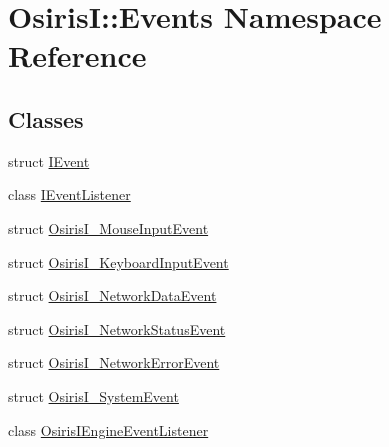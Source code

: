 \hypertarget{namespace_osiris_i_1_1_events}{\section{Osiris\-I\-:\-:Events Namespace Reference}
\label{namespace_osiris_i_1_1_events}
}
\subsection*{Classes}
\begin{DoxyCompactItemize}
\item 
struct \hyperlink{struct_osiris_i_1_1_events_1_1_i_event}{I\-Event}
\item 
class \hyperlink{class_osiris_i_1_1_events_1_1_i_event_listener}{I\-Event\-Listener}
\item 
struct \hyperlink{struct_osiris_i_1_1_events_1_1_osiris_i___mouse_input_event}{Osiris\-I\-\_\-\-Mouse\-Input\-Event}
\item 
struct \hyperlink{struct_osiris_i_1_1_events_1_1_osiris_i___keyboard_input_event}{Osiris\-I\-\_\-\-Keyboard\-Input\-Event}
\item 
struct \hyperlink{struct_osiris_i_1_1_events_1_1_osiris_i___network_data_event}{Osiris\-I\-\_\-\-Network\-Data\-Event}
\item 
struct \hyperlink{struct_osiris_i_1_1_events_1_1_osiris_i___network_status_event}{Osiris\-I\-\_\-\-Network\-Status\-Event}
\item 
struct \hyperlink{struct_osiris_i_1_1_events_1_1_osiris_i___network_error_event}{Osiris\-I\-\_\-\-Network\-Error\-Event}
\item 
struct \hyperlink{struct_osiris_i_1_1_events_1_1_osiris_i___system_event}{Osiris\-I\-\_\-\-System\-Event}
\item 
class \hyperlink{class_osiris_i_1_1_events_1_1_osiris_i_engine_event_listener}{Osiris\-I\-Engine\-Event\-Listener}
\end{DoxyCompactItemize}
